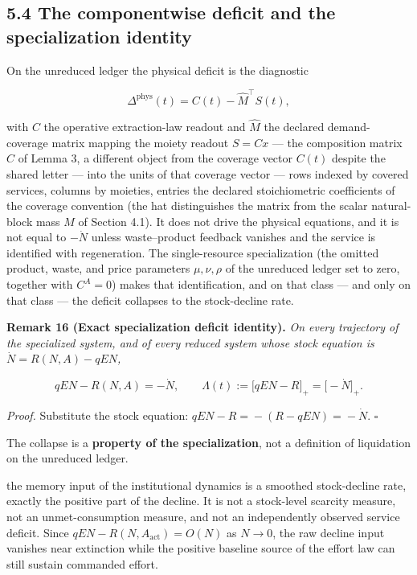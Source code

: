 \documentclass[11pt]{article}
\begin{document}
\subsection*{5.4 The componentwise deficit and the specialization identity}\label{54-the-componentwise-deficit-and-the-specialization-identity}

On the unreduced ledger the physical deficit is the diagnostic 

$$\Delta^{\mathrm{phys}}(t) = C(t) - \widehat{M}^\top S(t),$$

 with \(C\) the operative extraction-law readout and \(\widehat{M}\) the declared demand-coverage matrix mapping the moiety readout \(S = Cx\) --- the composition matrix \(C\) of Lemma 3, a different object from the coverage vector \(C(t)\) despite the shared letter --- into the units of that coverage vector --- rows indexed by covered services, columns by moieties, entries the declared stoichiometric coefficients of the coverage convention (the hat distinguishes the matrix from the scalar natural-block mass \(M\) of Section 4.1). It does not drive the physical equations, and it is not equal to \(-\dot N\) unless waste--product feedback vanishes and the service is identified with regeneration. The single-resource specialization (the omitted product, waste, and price parameters \(\mu, \nu, \rho\) of the unreduced ledger set to zero, together with \(C^A = 0\)) makes that identification, and on that class --- and only on that class --- the deficit collapses to the stock-decline rate.

\textbf{Remark 16 (Exact specialization deficit identity).} \emph{On every trajectory of the specialized system, and of every reduced system whose stock equation is \(\dot N = R(N,A) - qEN\),} 

$$qEN - R(N,A) = -\dot N, \qquad \Lambda(t) := \bigl[ qEN - R \bigr]_+ = \bigl[ -\dot N \bigr]_+.$$



\emph{Proof.} Substitute the stock equation: \(qEN - R =\allowbreak{} -(R - qEN) =\allowbreak{} -\dot N\). \(\square\)

The collapse is a \textbf{property of the specialization}, not a definition of liquidation on the unreduced ledger.

the memory input of the institutional dynamics is a smoothed stock-decline rate, exactly the positive part of the decline. It is not a stock-level scarcity measure, not an unmet-consumption measure, and not an independently observed service deficit. Since \(qEN-R(N,\allowbreak{}A_{\mathrm{act}})=\allowbreak{}O(N)\) as \(N\to0\), the raw decline input vanishes near extinction while the positive baseline source of the effort law can still sustain commanded effort.
\end{document}
